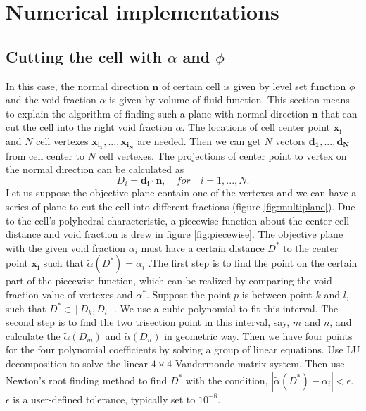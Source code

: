 \section{Numerical implementations}
\subsection{Cutting the cell with $\alpha$ and $\phi$}
In this case, the normal direction $\mathbf{n}$ of certain cell is given by level set function $\phi$ and the void fraction $\alpha$ is given by volume of fluid function. This section means to explain the algorithm of finding such a plane with normal direction $\mathbf{n}$ that can cut the cell into the right void fraction $\alpha$. The locations of cell center point $\mathbf{x_i}$ and $N$ cell vertexes $\mathbf{x_{i_1}},...,\mathbf{x_{i_N}}$ are needed. Then we can get $N$ vectors $\mathbf{d_1},...,\mathbf{d_N}$ from cell center to $N$ cell vertexes. The projections of center point to vertex on the normal direction can be calculated as
\begin{equation}\label{21}
D_i=\mathbf{d_i}\cdot\mathbf{n},\quad for\quad i=1,...,N.
\end{equation}
Let us suppose the objective plane contain one of the vertexes and we can have a series of plane to cut the cell into different fractions (figure \ref{fig:multiplane}). Due to the cell's polyhedral characteristic, a piecewise function about the center cell distance and void fraction is drew in figure \ref{fig:piecewise}. The objective plane with the given void fraction $\alpha_i$ must have a certain distance $D^*$ to the center point $\mathbf{x_i}$ such that $\tilde{\alpha}(D^*)=\alpha_i $ .The first step is to find the point on the certain part of the piecewise function, which can be realized by comparing the void fraction value of vertexes and $\alpha^*$. Suppose the point $p$ is between point $k$ and $l$, such that ${D^*}\in[D_k,D_l]$. We use a cubic polynomial to fit this interval. The second step is to find the two trisection point in this interval, say, $m$ and $n$, and calculate the $\tilde{\alpha}(D_m)$ and $\tilde{\alpha}(D_n)$ in geometric way. Then we have four points for the four polynomial coefficients by solving a group of linear equations. Use LU decomposition to solve the linear $4\times4$ Vandermonde matrix system. Then use Newton's root finding method to find $D^*$ with the condition, $\left|\tilde{\alpha}(D^*)-\alpha_i\right|<\epsilon$. $\epsilon$ is a user-defined tolerance, typically set to $10^{-8}$.


